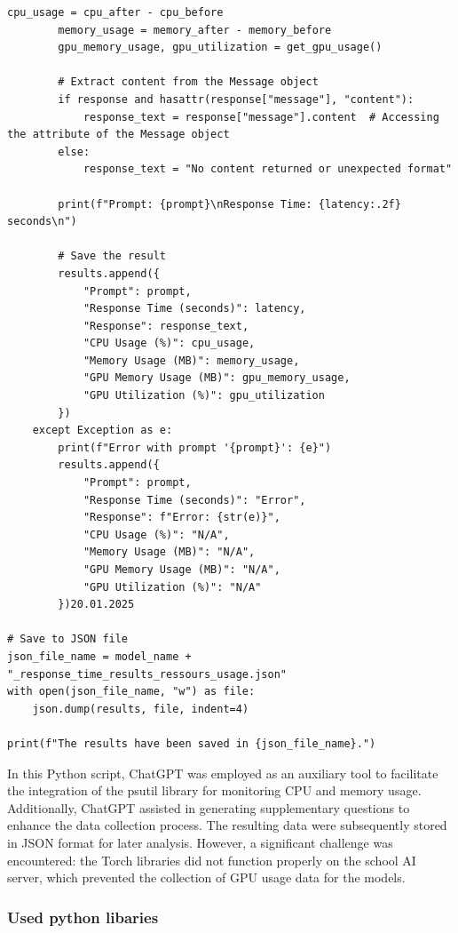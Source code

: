 \begin{lstlisting}[style=Python, caption={Python-quantitative-data-collection}, captionpos=b]
        cpu_usage = cpu_after - cpu_before
        memory_usage = memory_after - memory_before
        gpu_memory_usage, gpu_utilization = get_gpu_usage()

        # Extract content from the Message object
        if response and hasattr(response["message"], "content"):
            response_text = response["message"].content  # Accessing the attribute of the Message object
        else:
            response_text = "No content returned or unexpected format"

        print(f"Prompt: {prompt}\nResponse Time: {latency:.2f} seconds\n")

        # Save the result
        results.append({
            "Prompt": prompt,
            "Response Time (seconds)": latency,
            "Response": response_text,
            "CPU Usage (%)": cpu_usage,
            "Memory Usage (MB)": memory_usage,
            "GPU Memory Usage (MB)": gpu_memory_usage,
            "GPU Utilization (%)": gpu_utilization
        })
    except Exception as e:
        print(f"Error with prompt '{prompt}': {e}")
        results.append({
            "Prompt": prompt,
            "Response Time (seconds)": "Error",
            "Response": f"Error: {str(e)}",
            "CPU Usage (%)": "N/A",
            "Memory Usage (MB)": "N/A",
            "GPU Memory Usage (MB)": "N/A",
            "GPU Utilization (%)": "N/A"
        })20.01.2025

# Save to JSON file
json_file_name = model_name + "_response_time_results_ressours_usage.json"
with open(json_file_name, "w") as file:
    json.dump(results, file, indent=4)

print(f"The results have been saved in {json_file_name}.")

\end{lstlisting}


In this Python script, ChatGPT was employed as an auxiliary tool to facilitate the integration of the psutil library for monitoring CPU 
and memory usage. Additionally, ChatGPT assisted in generating supplementary questions to enhance the data collection process. 
The resulting data were subsequently stored in JSON format for later analysis. However, a significant challenge was encountered: 
the Torch libraries did not function properly on the school AI server, which prevented the collection of GPU usage data for the models.

\subsubsection{Used python libaries}

